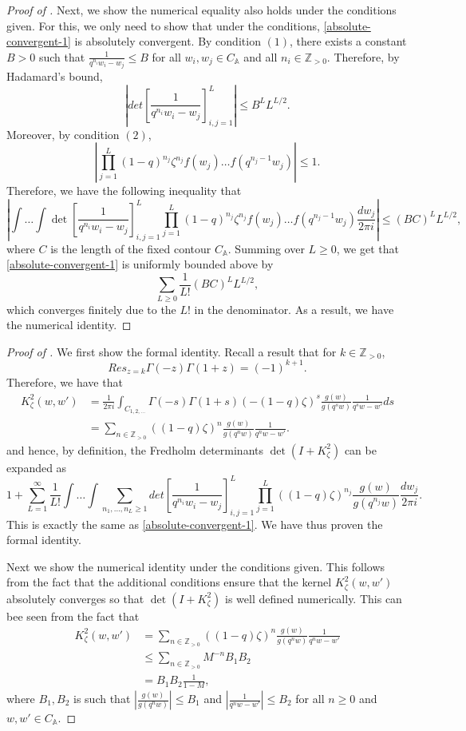 \begin{proof}[Proof of ]
Next, we show the numerical equality also holds under the conditions given. For this, we only need to show that under the conditions, \eqref{absolute-convergent-1} is absolutely convergent. By condition $(1)$, there exists a constant $B > 0$ such that $\frac{1}{q^{n_i} w_i - w_j} \le B$ for all $w_i, w_j \in C_{\mathbb{A}}$ and all $n_i \in \mathbb{Z}_{>0}$. Therefore, by Hadamard's bound, $$\left| det\left[ \frac{1}{q^{n_i} w_i - w_j} \right]_{i,j=1}^{L} \right| \le B^L L^{L/2}.$$
Moreover, by condition $(2)$, $$\left| \prod_{j=1}^{L} (1-q)^{n_j} \zeta^{n_j} f(w_j) \dots f(q^{n_j-1} w_j) \right| \le 1.$$ Therefore, we have the following inequality that 
$$\left| \int \dots \int  \det\left[ \frac{1}{q^{n_i} w_i - w_j} \right]_{i,j=1}^{L} \prod_{j=1}^{L} (1-q)^{n_j} \zeta^{n_j} f(w_j) \dots f(q^{n_j-1} w_j) \frac{dw_j}{2 \pi i} \right| \le (BC)^L L^{L/2},$$
where $C$ is the length of the fixed contour $C_{\mathbb{A}}$. Summing over $L \ge 0$, we get that \eqref{absolute-convergent-1} is uniformly bounded above by $$\sum_{L \ge 0} \frac{1}{L!}(BC)^L L^{L/2},$$ which converges finitely due to the $L!$ in the denominator. As a result, we have the numerical identity.
\end{proof}
\begin{proof}[Proof of ]
We first show the formal identity. Recall a result that for $k \in \mathbb{Z}_{> 0}$, $$Res_{z = k} \Gamma(-z) \Gamma(1+z) = (-1)^{k+1}.$$ Therefore, we have that
\begin{align*}
K_{\zeta}^2(w,w') &= \frac{1}{2 \pi i} \int_{C_{1,2,\dots}} \Gamma(-s) \Gamma(1+s) (-(1-q)\zeta)^s \frac{g(w)}{g(q^sw)} \frac{1}{q^sw - w'} ds\\
&= \sum_{n \in \mathbb{Z}_{>0}} ((1-q) \zeta)^n \frac{g(w)}{g(q^nw)} \frac{1}{q^n w - w'}.
\end{align*}
and hence, by definition, the Fredholm determinants $\det(I+K_{\zeta}^2)$ can be expanded as
$$1 + \sum_{L=1}^{\infty} \frac{1}{L!} \int \dots \int \sum_{n_1, \dots, n_L \ge 1} det\left[ \frac{1}{q^{n_i} w_i - w_j} \right]_{i,j = 1}^{L} \prod_{j=1}^{L} ((1-q)\zeta)^{n_j} \frac{g(w)}{g(q^{n_j} w)} \frac{dw_j}{2 \pi i}.$$
This is exactly the same as \eqref{absolute-convergent-1}. We have thus proven the formal identity.

Next we show the numerical identity under the conditions given. This follows from the fact that the additional conditions ensure that the kernel $K_{\zeta}^2(w,w')$ absolutely converges so that $\det(I+K_{\zeta}^2)$ is well defined numerically. This can bee seen from the fact that 
\begin{align*}
K_{\zeta}^2(w,w') &= \sum_{n \in \mathbb{Z}_{>0}} ((1-q) \zeta)^n \frac{g(w)}{g(q^nw)} \frac{1}{q^n w - w'}\\
&\le \sum_{n \in \mathbb{Z}_{>0}} M^{-n} B_1 B_2\\
&= B_1 B_2 \frac{1}{1-M},
\end{align*}
where $B_1, B_2$ is such that $\left| \frac{g(w)}{g(q^nw)} \right| \le B_1$ and $\left| \frac{1}{q^n w - w'} \right| \le B_2$ for all $n \ge 0$ and $w, w' \in C_{\mathbb{A}}$.
\end{proof}

